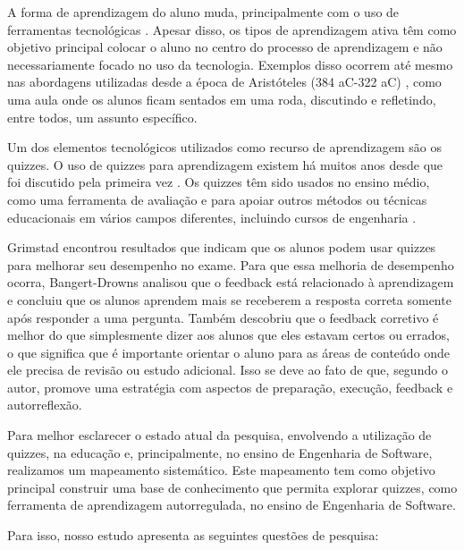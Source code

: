 A forma de aprendizagem do aluno muda, principalmente com o uso de ferramentas tecnológicas \cite{nilson_creating_2013, fink_creating_2013, ebert_school_2013}. Apesar disso, os tipos de aprendizagem ativa têm como objetivo principal colocar o aluno no centro do processo de aprendizagem e não necessariamente focado no uso da tecnologia. Exemplos disso ocorrem até mesmo nas abordagens utilizadas desde a época de Aristóteles (384 aC-322 aC) \cite{berge_computer_1995}, como uma aula onde os alunos ficam sentados em uma roda, discutindo e refletindo, entre todos, um assunto específico.

Um dos elementos tecnológicos utilizados como recurso de aprendizagem são os quizzes. O uso de quizzes para aprendizagem existem há muitos anos desde que foi discutido pela primeira vez \cite{mawhinney_comparison_1971}. Os quizzes têm sido usados no ensino médio, como uma ferramenta de avaliação e para apoiar outros métodos ou técnicas educacionais em vários campos diferentes, incluindo cursos de engenharia \cite{herold_student_2012, thevathayan_imparting_2017, figueiredo_evaluation_2014}. 

Grimstad \cite {grimstad_are_2004} encontrou resultados que indicam que os alunos podem usar quizzes para melhorar seu desempenho no exame. Para que essa melhoria de desempenho ocorra, Bangert-Drowns \cite {bangert-drowns_instructional_1991} analisou que o feedback está relacionado à aprendizagem e concluiu que os alunos aprendem mais se receberem a resposta correta somente após responder a uma pergunta. Também descobriu que o feedback corretivo é melhor do que simplesmente dizer aos alunos que eles estavam certos ou errados, o que significa que é importante orientar o aluno para as áreas de conteúdo onde ele precisa de revisão ou estudo adicional. Isso se deve ao fato de que, segundo o autor, promove uma estratégia com aspectos de preparação, execução, feedback e autorreflexão.

Para melhor esclarecer o estado atual da pesquisa, envolvendo a utilização de quizzes, na educação e, principalmente, no ensino de Engenharia de Software, realizamos um mapeamento sistemático. Este mapeamento tem como objetivo principal construir uma base de conhecimento que permita explorar quizzes, como ferramenta de aprendizagem autorregulada, no ensino de Engenharia de Software.

Para isso, nosso estudo apresenta as seguintes questões de pesquisa:

